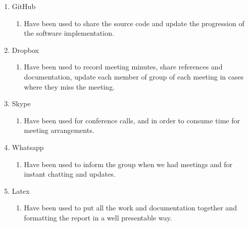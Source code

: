 \begin{enumerate}
\item GitHub
\begin{enumerate}
\item Have been used to share the source code and update the progression of the software implementation.

\end{enumerate} 
\item Dropbox
\begin{enumerate}
\item Have been used to record meeting minutes, share references and documentation, update each member of group of each meeting in cases where they miss the meeting.

\end{enumerate} 
\item Skype 
\begin{enumerate}
\item Have been used for conference calls, and in order to consume time for meeting arrangements.

\end{enumerate} 
\item Whatsapp 
\begin{enumerate}
\item Have been used to inform the group when we had meetings and for instant chatting and updates.

\end{enumerate} 
\item Latex 
\begin{enumerate}
\item Have been used to put all the work and documentation together and formatting the report in a well presentable way. 
 
\end{enumerate} 
\end{enumerate}
  
  

